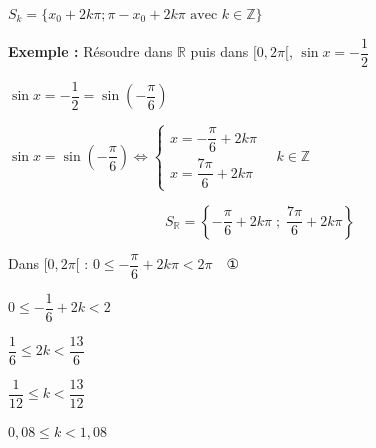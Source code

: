 \documentclass[12pt,a4paper]{article}
\begin{document}
$\boxed{S_k = \{x_0 + 2k\pi; \pi - x_0 + 2k\pi \text{ avec } k \in \mathbb{Z}\}}$

\vspace{1cm}

\noindent \textbf{Exemple :} Résoudre dans $\mathbb{R}$ puis dans $[0, 2\pi[$, $\sin x = -\dfrac{1}{2}$

\vspace{0.3cm}

\noindent $\sin x = -\dfrac{1}{2} = \sin\left(-\dfrac{\pi}{6}\right)$

\vspace{0.2cm}

\noindent $\sin x = \sin\left(-\dfrac{\pi}{6}\right) \iff \begin{cases} x = -\dfrac{\pi}{6} + 2k\pi \\ x = \dfrac{7\pi}{6} + 2k\pi \end{cases} \quad k \in \mathbb{Z}$

\vspace{0.4cm}

\[
S_{\mathbb{R}} = \left\{ -\dfrac{\pi}{6} + 2k\pi \;;\; \dfrac{7\pi}{6} + 2k\pi \right\}
\]

\vspace{0.4cm}

\noindent Dans $[0, 2\pi[$ : \hspace{1cm} $0 \le -\dfrac{\pi}{6} + 2k\pi < 2\pi \quad \text{①}$

\vspace{0.2cm}

\noindent \phantom{Dans $[0, 2\pi[$ : \hspace{1cm}} $0 \le -\dfrac{1}{6} + 2k < 2$

\vspace{0.2cm}

\noindent \phantom{Dans $[0, 2\pi[$ : \hspace{1cm}} $\dfrac{1}{6} \le 2k < \dfrac{13}{6}$

\vspace{0.2cm}

\noindent \phantom{Dans $[0, 2\pi[$ : \hspace{1cm}} $\dfrac{1}{12} \le k < \dfrac{13}{12}$

\vspace{0.2cm}

\noindent \phantom{Dans $[0, 2\pi[$ : \hspace{1cm}} $0{,}08 \le k < 1{,}08$

\vspace{0.4cm}
\end{document}
